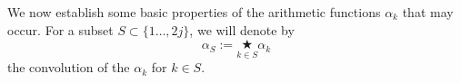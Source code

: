 \documentclass[12pt,a4paper,reqno]{amsart}
\numberwithin{equation}{section}
\theoremstyle{plain}
\theoremstyle{definition}
\newcommand\eps{\varepsilon}
\newcommand{\onef}{\mathbf{1}}
\begin{document}

We now establish some basic properties of the arithmetic functions
$\alpha_k$ that may occur. For a subset $S\subset \{1\ldots, 2j\}$, we
will denote  by
$$
\alpha_S:=\underset{k\in S}{\bigstar}{\alpha_k}
$$
the convolution of the $\alpha_k$ for $k\in S$.
\end{document}
